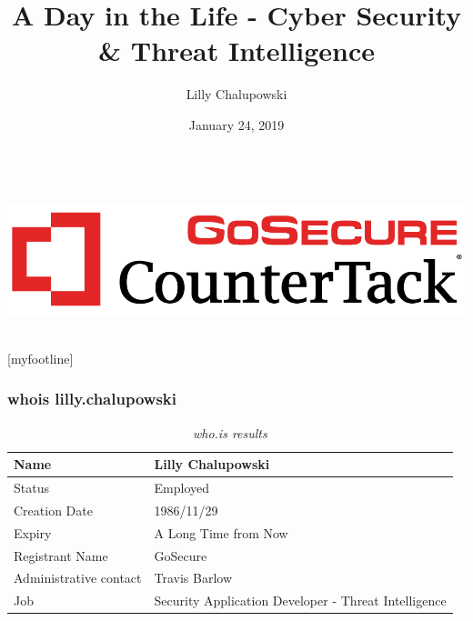 \documentclass[aspectratio=169]{beamer}
\title{A Day in the Life - Cyber Security \& Threat Intelligence}
\institute{GoSecure}
\author{Lilly Chalupowski}
\date{January 24, 2019}
\begin{document}
\begin{frame}[t]
  \begin{center}
    \begingroup
    \fontsize{20pt}{20pt}\selectfont
    \inserttitle \\
    \endgroup
    \bigskip
    \includegraphics[width=14cm,keepaspectratio]{gosecure} \\
    \bigskip
    \bigskip
    \bigskip
    \insertauthor \\
    \insertdate
  \end{center}
\end{frame}

[myfootline]

\begin{frame}
  \frametitle{whois lilly.chalupowski}
  \begin{table}
    \caption{\textit{who.is results}}
    \begin{tabularx}{\textwidth}{|X|X|}
      \hline
      Name & Lilly Chalupowski \\
      \hline
      Status & Employed \\
      \hline
      Creation Date & 1986/11/29 \\
      \hline
      Expiry & A Long Time from Now \\
      \hline
      Registrant Name & GoSecure \\
      \hline
      Administrative contact & Travis Barlow \\
      \hline
      Job & Security Application Developer - Threat Intelligence \\
      \hline
    \end{tabularx}
  \end{table}
\end{frame}
\end{document}
